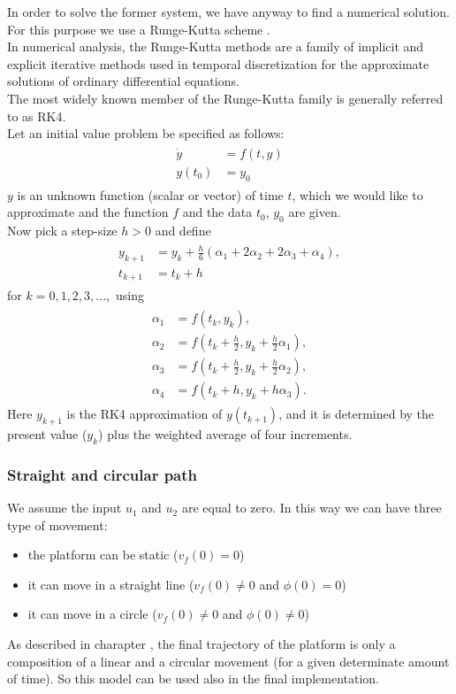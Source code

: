 In order to solve the former system, we have anyway to find a numerical solution. For this purpose we use a    
Runge-Kutta scheme  \cite{wiki_runge_kutta}.\\
In numerical analysis, the Runge-Kutta methods are a family of implicit and explicit iterative methods used in temporal discretization for the approximate solutions of ordinary differential equations.\\
The most widely known member of the Runge-Kutta family is generally referred to as RK4.\\
Let an initial value problem be specified as follows:
\begin{align}
\begin{split}
{\dot {y}}&=f(t,y) \\
y(t_{0})&=y_{0}
\end{split}
\end{align}
$y$ is an unknown function (scalar or vector) of time $t$, which we would like to approximate and the function $f$ and the data $t_{0}$, $y_{0}$ are given.\\
Now pick a step-size $h > 0$ and define
\begin{align}
\begin{split}
y_{k+1}&=y_{k}+{\tfrac {h}{6}}\left(\alpha_{1}+2\alpha_{2}+2\alpha_{3}+\alpha_{4}\right),\\
t_{k+1}&=t_{k}+h
\end{split}
\end{align}
for $k = 0, 1, 2, 3, ...,$ using
\begin{align}
\begin{split}
\alpha_{1}&=f(t_{k},y_{k}),\\
\alpha_{2}&=f(t_{k}+{\frac {h}{2}},y_{k}+{\frac {h}{2}}\alpha_{1}),\\
\alpha_{3}&=f(t_{k}+{\frac {h}{2}},y_{k}+{\frac {h}{2}}\alpha_{2}),\\
\alpha_{4}&=f(t_{k}+h,y_{k}+h\alpha_{3}).
\end{split}
\end{align}
Here  $y_{k+1}$ is the RK4 approximation of $y(t_{k+1})$, and it is determined by the present value ($y_{k}$) plus the weighted average of four increments.

\subsubsection{Straight and circular path}
We assume the input $u_1$ and $u_2$  are equal to zero. In this way we can have three type of movement:
\begin{itemize}
\item the platform can be static ($v_f(0) = 0$)
\item it can move in a straight line ($v_f(0) \neq 0$ and $\phi(0) = 0$)
\item it can move in a circle ($v_f(0) \neq 0$ and $\phi(0) \neq 0$)
\end{itemize}
As described in charapter \label{chap:thechallenge}, the final trajectory of the platform is only a composition of a linear and a circular movement (for a given determinate amount of time). So this model can be used also in the final implementation.

